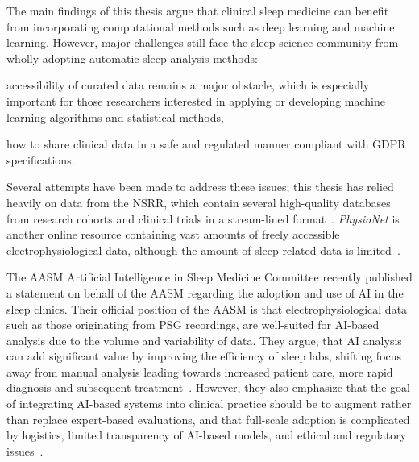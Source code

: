 The main findings of this thesis argue that clinical sleep medicine can benefit from incorporating computational methods such as deep learning and machine learning.
However, major challenges still face the sleep science community from wholly adopting automatic sleep analysis methods: %
\begin{enumerate*}[label=\roman*)]
    \item accessibility of curated data remains a major obstacle, which is especially important for those researchers interested in applying or developing machine learning algorithms and statistical methods, 
    \item how to share clinical data in a safe and regulated manner compliant with GDPR specifications.
\end{enumerate*}
Several attempts have been made to address these issues; this thesis has relied heavily on data from the \ac{NSRR}, which contain several high-quality databases from research cohorts and clinical trials in a stream-lined format~\cite{Dean2016, Zhang2018}. 
\emph{PhysioNet} is another online resource containing vast amounts of freely accessible electrophysiological data, although the amount of sleep-related data is limited~\cite{Goldberger2000}. 

The \ac{AASM} Artificial Intelligence in Sleep Medicine Committee recently published a statement on behalf of the \ac{AASM} regarding the adoption and use of \ac{AI} in the sleep clinics.
Their official position of the \ac{AASM} is that electrophysiological data such as those originating from \ac{PSG} recordings, are well-suited for \ac{AI}-based analysis due to the volume and variability of data. 
They argue, that \ac{AI} analysis can add significant value by improving the efficiency of sleep labs, shifting focus away from manual analysis leading towards increased patient care, more rapid diagnosis and subsequent treatment~\cite{Goldstein2020a}.
However, they also emphasize that the goal of integrating \ac{AI}-based systems into clinical practice should be to augment rather than replace expert-based evaluations, and that full-scale adoption is complicated by logistics, limited transparency of \ac{AI}-based models, and ethical and regulatory issues~\cite{Goldstein2020b}.

